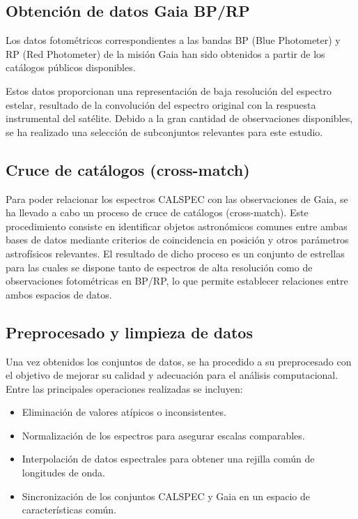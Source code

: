 \documentclass{article}
\begin{document}
\subsection{Obtención de datos Gaia BP/RP}
Los datos fotométricos correspondientes a las bandas BP (Blue Photometer) y RP (Red Photometer) de la misión Gaia han sido obtenidos a partir de los catálogos públicos disponibles.

Estos datos proporcionan una representación de baja resolución del espectro estelar, resultado de la convolución del espectro original con la respuesta instrumental del satélite. Debido a la gran cantidad de observaciones disponibles, se ha realizado una selección de subconjuntos relevantes para este estudio.

\subsection{Cruce de catálogos (cross-match)}

Para poder relacionar los espectros CALSPEC con las observaciones de Gaia, se ha llevado a cabo un proceso de cruce de catálogos (cross-match).
Este procedimiento consiste en identificar objetos astronómicos comunes entre ambas bases de datos mediante criterios de coincidencia en posición y otros parámetros astrofísicos relevantes. El resultado de dicho proceso es un conjunto de estrellas para las cuales se dispone tanto de espectros de alta resolución como de observaciones fotométricas en BP/RP, lo que permite establecer relaciones entre ambos espacios de datos.

\subsection{Preprocesado y limpieza de datos}

Una vez obtenidos los conjuntos de datos, se ha procedido a su preprocesado con el objetivo de mejorar su calidad y adecuación para el análisis computacional.
Entre las principales operaciones realizadas se incluyen:

\begin{itemize}
    \item Eliminación de valores atípicos o inconsistentes.
    \item Normalización de los espectros para asegurar escalas comparables.
    \item Interpolación de datos espectrales para obtener una rejilla común de longitudes de onda.
    \item Sincronización de los conjuntos CALSPEC y Gaia en un espacio de características común.
\end{itemize}
\end{document}
